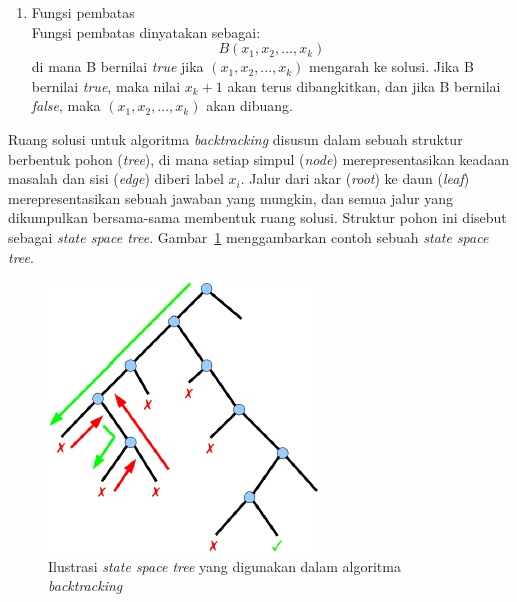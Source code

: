 \documentclass[a4paper,twoside]{article}
\begin{document}
\begin{enumerate}
\begin{enumerate}
\item Fungsi pembatas
\\ Fungsi pembatas dinyatakan sebagai:
\begin{displaymath}
B(x_1, x_2, ..., x_k)
\end{displaymath}
di mana B bernilai \textit{true} jika \begin{math}(x_1, x_2, ..., x_k)\end{math} mengarah ke solusi. Jika B bernilai \textit{true}, maka nilai \begin{math}x_k+1\end{math} akan terus dibangkitkan, dan jika B bernilai \textit{false}, maka \begin{math}(x_1, x_2, ..., x_k)\end{math} akan dibuang.
\end{enumerate}

Ruang solusi untuk algoritma \textit{backtracking} disusun dalam sebuah struktur berbentuk pohon (\textit{tree}), di mana setiap simpul (\textit{node}) merepresentasikan keadaan masalah dan sisi (\textit{edge}) diberi label \begin{math}x_i\end{math}. Jalur dari akar (\textit{root}) ke daun (\textit{leaf}) merepresentasikan sebuah jawaban yang mungkin, dan semua jalur yang dikumpulkan bersama-sama membentuk ruang solusi. Struktur pohon ini disebut sebagai \textit{state space tree}. Gambar~\ref{fig:backtracking3} menggambarkan contoh sebuah \textit{state space tree}.

\begin{figure}
\centering
\captionsetup{justification=centering}
\includegraphics[scale=1]{Gambar/Backtracking3}
\caption[Ilustrasi \textit{state space tree} yang digunakan dalam algoritma  \textit{backtracking}  ~\cite{Fahda}]{Ilustrasi \textit{state space tree} yang digunakan dalam algoritma  \textit{backtracking} ~\cite{Fahda}}
\label{fig:backtracking3}
\end{figure}


\end{enumerate}
\end{document}
